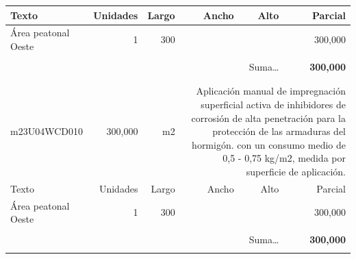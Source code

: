\documentclass{book}%
\begin{document}
\begin{longtable}{lrrrrr}
Texto&Unidades&Largo&Ancho&Alto&Parcial\\%
\hline%
\multicolumn{1}{p{3.5cm}}{Área peatonal Oeste}&1&300&&&   300,000\\%
&&&&&\\%
\multicolumn{5}{r}{Suma\ldots}&\textbf{   300,000}\\%
\hline%
&&&&&\\%
&&&&&\\%
m23U04WCD010&   300,000& m2&\multicolumn{3}{p{6cm}}{\scriptsize Aplicación manual de impregnación superficial activa de inhibidores de corrosión de alta penetración para la protección de las armaduras del hormigón. con un consumo medio de 0,5 - 0,75 kg/m2, medida por superficie de aplicación.\normalsize}\\%
Texto&Unidades&Largo&Ancho&Alto&Parcial\\%
\hline%
\multicolumn{1}{p{3.5cm}}{Área peatonal Oeste}&1&300&&&   300,000\\%
&&&&&\\%
\multicolumn{5}{r}{Suma\ldots}&\textbf{   300,000}\\%
\hline%
&&&&&\\%
\end{longtable}%
\newpage

%
\end{document}
